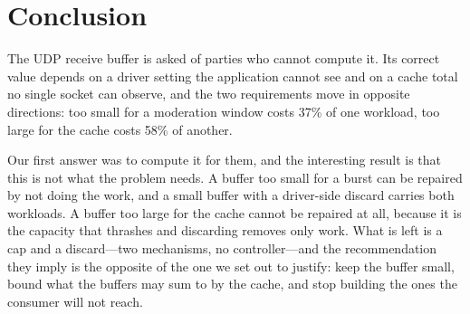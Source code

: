 \documentclass[letterpaper,twocolumn,10pt]{article}
\begin{document}
\section{Conclusion}

The UDP receive buffer is asked of parties who cannot compute it. Its correct
value depends on a driver setting the application cannot see and on a cache
total no single socket can observe, and the two requirements move in opposite
directions: too small for a moderation window costs 37\% of one workload, too
large for the cache costs 58\% of another.

Our first answer was to compute it for them, and the interesting result is that
this is not what the problem needs. A buffer too small for a burst can be
repaired by not doing the work, and a small buffer with a driver-side discard
carries both workloads. A buffer too large for the cache cannot be repaired at
all, because it is the capacity that thrashes and discarding removes only work.
What is left is a cap and a discard---two mechanisms, no controller---and the
recommendation they imply is the opposite of the one we set out to justify:
keep the buffer small, bound what the buffers may sum to by the cache, and stop
building the ones the consumer will not reach.
\end{document}
